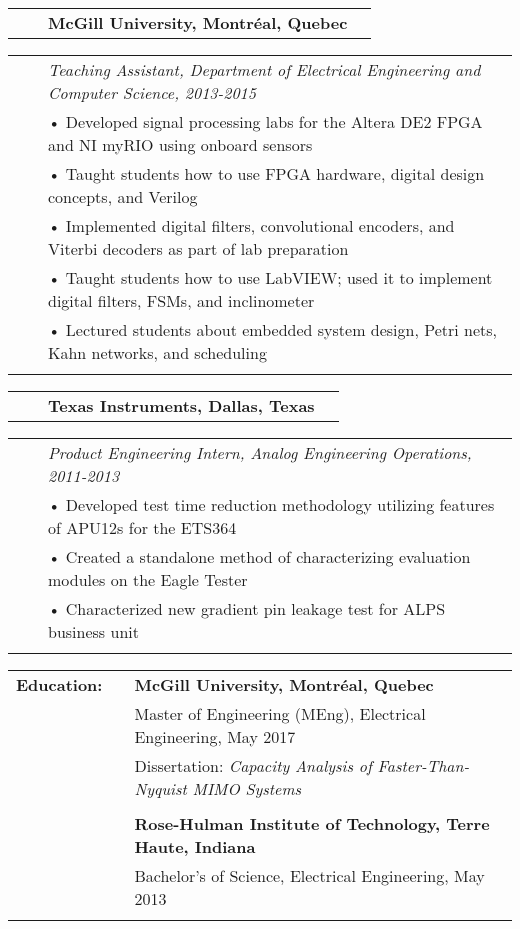 \documentclass{minimal}
\begin{document}
\begin{tabular}{ p{1.5cm} p{1cm} p{10cm} >{\raggedleft\arraybackslash}p{3cm} }
& & \textbf{McGill University, Montréal, Quebec} & \\
\end{tabular}

\begin{tabular}{ p{1.5cm} p{1cm} p{16cm} }
& & \textit{Teaching Assistant, Department of Electrical Engineering and Computer Science, 2013-2015}\\
& & • Developed signal processing labs for the Altera DE2 FPGA and NI myRIO using onboard sensors\\
& & • Taught students how to use FPGA hardware, digital design concepts, and Verilog\\
& & • Implemented digital filters, convolutional encoders, and Viterbi decoders as part of lab preparation\\
& & • Taught students how to use LabVIEW; used it to implement digital filters, FSMs, and inclinometer\\
& & • Lectured students about embedded system design, Petri nets, Kahn networks, and scheduling\\
& & \\
\end{tabular}

\begin{tabular}{ p{1.5cm} p{1cm} p{10cm} >{\raggedleft\arraybackslash}p{3cm} }
& & \textbf{Texas Instruments, Dallas, Texas} & \\
\end{tabular}

\begin{tabular}{ p{1.5cm} p{1cm} p{16cm} }
& & \textit{Product Engineering Intern, Analog Engineering Operations, 2011-2013}\\
& & • Developed test time reduction methodology utilizing features of APU12s for the ETS364\\
& & • Created a standalone method of characterizing evaluation modules on the Eagle Tester\\
& & • Characterized new gradient pin leakage test for ALPS business unit\\
& & \\
\end{tabular}

\begin{tabular}{ p{1.5cm} p{1cm} p{16cm} }
\textbf{Education:} & & \textbf{McGill University, Montréal, Quebec} \\
& & Master of Engineering (MEng), Electrical Engineering, May 2017\\
& & Dissertation: \textit{Capacity Analysis of Faster-Than-Nyquist MIMO Systems}\\
& & \\
& & \textbf{Rose-Hulman Institute of Technology, Terre Haute, Indiana} \\
& & Bachelor's of Science, Electrical Engineering, May 2013\\
& & \\
\end{tabular}
\end{document}
